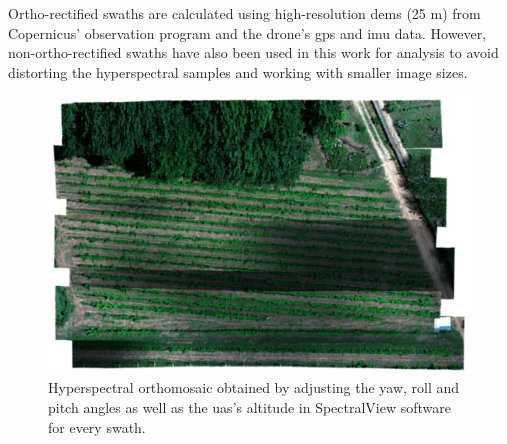 Ortho-rectified swaths are calculated using high-resolution \acrshort{dem}s (25 \si{\meter}) from Copernicus' observation program \cite{european_environment_agency_eu_2017} and the drone's \acrshort{gps} and \acrshort{imu} data. However, non-ortho-rectified swaths have also been used in this work for analysis to avoid distorting the hyperspectral samples and working with smaller image sizes.

\FloatBarrier
\begin{figure}[H]
    \centering
    \includegraphics[width=0.8\linewidth]{figs/materials/orthorectified_hyper.png}
    \caption{Hyperspectral orthomosaic obtained by adjusting the yaw, roll and pitch angles as well as the \acrshort{uas}'s altitude in SpectralView\texttrademark \hspace{.3mm} software for every swath.}
    \label{fig:orthorectified_hyper}
\end{figure}

